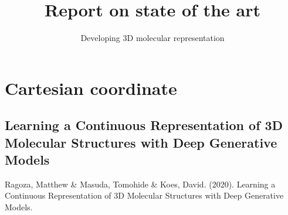 \documentclass[]{report}
\title{Report on state of the art}
\author{Developing 3D molecular representation}
\begin{document}
\maketitle
\chapter{Cartesian coordinate}


\section{Learning a Continuous Representation of 3D Molecular Structures with Deep Generative Models}

Ragoza, Matthew \& Masuda, Tomohide \& Koes, David. (2020). Learning a Continuous Representation of 3D Molecular Structures with Deep Generative Models. 
\end{document}
